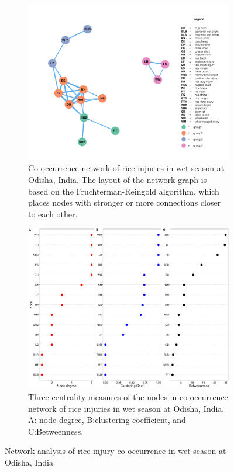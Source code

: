 \begin{figure}
    \centering
    \begin{subfigure}[b]{1\textwidth}
        \includegraphics[width = 1\textwidth]{figures/networkOR_ws/networkOR_ws.pdf}
        \caption{Co-occurrence network of rice injuries in wet season at Odisha, India. The layout of the network graph is based on the Fruchterman-Reingold algorithm, which places nodes with stronger or more connections closer to each other.}
        \label{fig:networkOR_ws}
    \end{subfigure}
    \begin{subfigure}[b]{1\textwidth}
        \includegraphics[width = 1\textwidth]{figures/nodepropOR_ws/nodepropOR_ws.pdf}
        \caption{Three centrality measures of the nodes in co-occurrence network of rice injuries in wet season at Odisha, India. A: node degree, B:clustering coefficient, and C:Betweenness.}
        \label{fig:nodepropOR_ws}
    \end{subfigure}
    \caption{Network analysis of rice injury co-occurrence in wet season at Odisha, India}
    \label{fig:OD_ws}
\end{figure}


